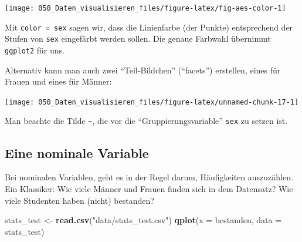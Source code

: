 \documentclass[12pt,ngerman,]{book}
\makeatletter
\newenvironment{Shaded}{\begin{snugshade}}{\end{snugshade}}
\newcommand{\KeywordTok}[1]{\textcolor[rgb]{0.13,0.29,0.53}{\textbf{#1}}}
\newcommand{\DataTypeTok}[1]{\textcolor[rgb]{0.13,0.29,0.53}{#1}}
\newcommand{\DecValTok}[1]{\textcolor[rgb]{0.00,0.00,0.81}{#1}}
\newcommand{\StringTok}[1]{\textcolor[rgb]{0.31,0.60,0.02}{#1}}
\newcommand{\OperatorTok}[1]{\textcolor[rgb]{0.81,0.36,0.00}{\textbf{#1}}}
\newcommand{\NormalTok}[1]{#1}
\newenvironment{kframe}{%
\medskip{}
\setlength{\fboxsep}{.8em}
 \def\at@end@of@kframe{}%
 \ifinner\ifhmode%
  \def\at@end@of@kframe{\end{minipage}}%
  \begin{minipage}{\columnwidth}%
 \fi\fi%
 \def\FrameCommand##1{\hskip\@totalleftmargin \hskip-\fboxsep
 \colorbox{shadecolor}{##1}\hskip-\fboxsep
     \hskip-\linewidth \hskip-\@totalleftmargin \hskip\columnwidth}%
 \MakeFramed {\advance\hsize-\width
   \@totalleftmargin\z@ \linewidth\hsize
   \@setminipage}}%
 {\par\unskip\endMakeFramed%
 \at@end@of@kframe}
\renewenvironment{Shaded}{\begin{kframe}}{\end{kframe}}
\theoremstyle{definition}
\theoremstyle{definition}
\theoremstyle{remark}
\makeatother
\begin{document}
\begin{center}\texttt{[image: 050\_Daten\_visualisieren\_files/figure-latex/fig-aes-color-1]} \end{center}

Mit \texttt{color\ =\ sex} sagen wir, dass die Linienfarbe (der Punkte)
entsprechend der Stufen von \texttt{sex} eingefärbt werden sollen. Die
genaue Farbwahl übernimmt \texttt{ggplot2} für uns.

Alternativ kann man auch zwei ``Teil-Bildchen'' (``facets'') erstellen,
eines für Frauen und eines für Männer:

\begin{Shaded}
\end{Shaded}

\begin{center}\texttt{[image: 050\_Daten\_visualisieren\_files/figure-latex/unnamed-chunk-17-1]} \end{center}

Man beachte die Tilde \texttt{\textasciitilde{}}, die vor die
``Gruppierungsvariable'' \texttt{sex} zu setzen ist.

\subsection{Eine nominale Variable}\label{eine-nominale-variable}

Bei nominalen Variablen, geht es in der Regel darum, Häufigkeiten
auszuzählen. Ein Klassiker: Wie viele Männer und Frauen finden sich in
dem Datensatz? Wie viele Studenten haben (nicht) bestanden?

\begin{Shaded}
\begin{Highlighting}[]
\NormalTok{stats_test <-}\StringTok{ }\KeywordTok{read.csv}\NormalTok{(}\StringTok{"data/stats_test.csv"}\NormalTok{)}
\KeywordTok{qplot}\NormalTok{(}\DataTypeTok{x =}\NormalTok{ bestanden, }\DataTypeTok{data =}\NormalTok{ stats_test)}
\end{Highlighting}
\end{Shaded}
\end{document}
